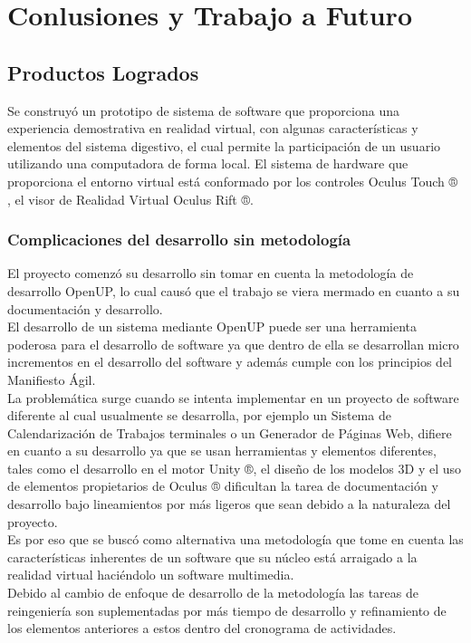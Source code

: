 \chapter{Conlusiones y Trabajo a Futuro}

\section{Productos Logrados}
Se construyó un prototipo de sistema de  software que proporciona una experiencia demostrativa en realidad virtual, con algunas características y 
elementos del sistema digestivo, el cual  permite la participación de un usuario utilizando una computadora de forma local. El sistema de hardware 
que proporciona el entorno virtual está conformado por los controles Oculus Touch ® , el visor de Realidad Virtual Oculus Rift ®.

\subsection{Complicaciones del desarrollo sin metodología}
El proyecto comenzó su desarrollo sin tomar en cuenta la metodología de desarrollo OpenUP, lo cual causó que el trabajo se viera mermado en cuanto a su documentación y desarrollo.\\
El desarrollo de un sistema mediante OpenUP puede ser una herramienta poderosa para el desarrollo de software ya que dentro de ella se desarrollan micro incrementos en el desarrollo del software y además cumple con los principios del Manifiesto Ágil\cite{beck2001manifesto}.\\
La problemática surge cuando se intenta implementar en un proyecto de software diferente al cual usualmente se desarrolla, por ejemplo un Sistema de Calendarización de Trabajos terminales o un Generador de Páginas Web, difiere en cuanto a su desarrollo ya que se usan herramientas y elementos diferentes, tales como el desarrollo en el motor Unity ®, el diseño de los modelos 3D y el uso de elementos propietarios de Oculus ® dificultan la tarea de documentación y desarrollo bajo lineamientos por más ligeros que sean debido a la naturaleza del proyecto.\\
Es por eso que se buscó como alternativa una metodología que tome en cuenta las características inherentes de un software que su núcleo está arraigado a la realidad virtual haciéndolo un software multimedia.\\
Debido al cambio de enfoque de desarrollo de la metodología las tareas de reingeniería son suplementadas por más tiempo de desarrollo y refinamiento de los elementos anteriores a estos dentro del cronograma de actividades.\\

